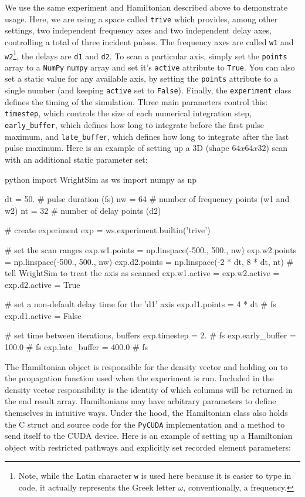 We use the same experiment and Hamiltonian described above to
demonstrate usage. Here, we are using a space called \texttt{trive}
which provides, among other settings, two independent frequency axes and
two independent delay axes, controlling a total of three incident
pulses. The frequency axes are called \texttt{w1} and
\texttt{w2}\footnote{Note, while the Latin character \texttt{w} is used
  here because it is easier to type in code, it actually represents the
  Greek letter \(\omega\), conventionally, a frequency.}, the delays are
\texttt{d1} and \texttt{d2}. To scan a particular axis, simply set the
\texttt{points} array to a \texttt{NumPy} \texttt{numpy} array and set
it's \texttt{active} attribute to \texttt{True}. You can also set a
static value for any available axis, by setting the \texttt{points}
attribute to a single number (and keeping \texttt{active} set to
\texttt{False}). Finally, the \texttt{experiment} class defines the
timing of the simulation. Three main parameters control this:
\texttt{timestep}, which controls the size of each numerical integration
step, \texttt{early\_buffer}, which defines how long to integrate before
the first pulse maximum, and \texttt{late\_buffer}, which defines how
long to integrate after the last pulse maximum. Here is an example of
setting up a 3D (shape \(64x64x32\)) scan with an additional static
parameter set:

\begin{codefragment}{python}
import WrightSim as ws
import numpy as np

dt = 50. # pulse duration (fs)
nw = 64 # number of frequency points (w1 and w2)
nt = 32 # number of delay points (d2)

# create experiment
exp = ws.experiment.builtin('trive')

# set the scan ranges
exp.w1.points = np.linspace(-500., 500., nw)
exp.w2.points = np.linspace(-500., 500., nw)
exp.d2.points = np.linspace(-2 * dt, 8 * dt, nt)
# tell WrightSim to treat the axis as scanned
exp.w1.active = exp.w2.active = exp.d2.active = True

# set a non-default delay time for the 'd1' axis
exp.d1.points = 4 * dt # fs
exp.d1.active = False

# set time between iterations, buffers
exp.timestep = 2. # fs
exp.early_buffer = 100.0 # fs
exp.late_buffer = 400.0 # fs
\end{codefragment}


The Hamiltonian object is responsible for the density vector and holding
on to the propagation function used when the experiment is run. Included
in the density vector responsibility is the identity of which columns
will be returned in the end result array. Hamiltonians may have
arbitrary parameters to define themselves in intuitive ways. Under the
hood, the Hamiltonian class also holds the C struct and source code for
the \texttt{PyCUDA} implementation and a method to send itself to the
CUDA device. Here is an example of setting up a Hamiltonian object with
restricted pathways and explicitly set recorded element parameters:

